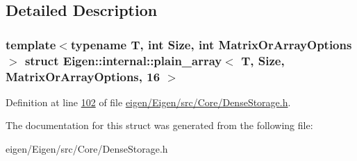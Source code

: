 \subsection{Detailed Description}
\subsubsection*{template$<$typename T, int Size, int Matrix\+Or\+Array\+Options$>$\newline
struct Eigen\+::internal\+::plain\+\_\+array$<$ T, Size, Matrix\+Or\+Array\+Options, 16 $>$}



Definition at line \hyperlink{eigen_2_eigen_2src_2_core_2_dense_storage_8h_source_l00102}{102} of file \hyperlink{eigen_2_eigen_2src_2_core_2_dense_storage_8h_source}{eigen/\+Eigen/src/\+Core/\+Dense\+Storage.\+h}.



The documentation for this struct was generated from the following file\+:\begin{DoxyCompactItemize}
\item 
eigen/\+Eigen/src/\+Core/\+Dense\+Storage.\+h\end{DoxyCompactItemize}
